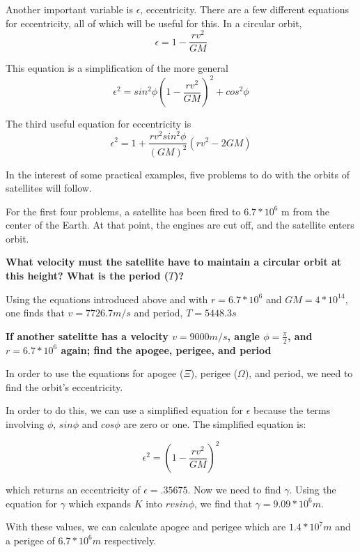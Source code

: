 \documentclass{article}
\begin{document}
Another important variable is $\epsilon$, eccentricity.  There are a few different equations for eccentricity, all of which will be useful for this.  In a circular orbit, $$\epsilon = 1 - \frac{rv^2}{GM}$$

This equation is a simplification of the more general $$\epsilon^2 = sin^2{\phi}( 1 - \frac{rv^2}{GM})^2 + cos^2{\phi}$$

The third useful equation for eccentricity is $$\epsilon^2 = 1 + \frac{rv^2sin^2{\phi}}{(GM)^2}(rv^2 - 2GM)$$

In the interest of some practical examples, five problems to do with the orbits of satellites will follow.

\bigskip
\bigskip

For the first four problems, a satellite has been fired to $6.7 * 10^6$ m from the center of the Earth.  At that point, the engines are cut off, and the satellite enters orbit.

\bigskip

\textbf{What velocity must the satellite have to maintain a circular orbit at this height?  What is the period ($T$)?}

\bigskip

Using the equations introduced above and with $ r = 6.7 * 10^6 $ and $ GM = 4 * 10^{14} $, one finds that $ v = 7726.7 m/s $ and period, $T = 5448.3s$

\bigskip

\textbf{ If another satelitte  has a velocity $v = 9000 m/s$, angle $\phi = \frac{\pi}{2}$, and $r = 6.7*10^6$ again; find the apogee, perigee, and period}

\bigskip

In order to use the equations for apogee ($\Xi$), perigee ($\Omega$), and period, we need to find the orbit's eccentricity.

In order to do this, we can use a simplified equation for $\epsilon$ because the terms involving $\phi$, $sin{\phi}$ and $cos{\phi}$ are zero or one.  The simplified equation is: 

$$\epsilon^2 = (1 - \frac{rv^2}{GM})^2$$

which returns an eccentricity of $\epsilon = .35675$.  Now we need to find $\gamma$.  Using the equation for $\gamma$ which expands $K$ into $rvsin{\phi}$, we find that $\gamma = 9.09*10^6 m$. 

\bigskip

With these values, we can calculate apogee and perigee which are $1.4*10^7m$ and a perigee of $6.7*10^6m$ respectively.
\end{document}
